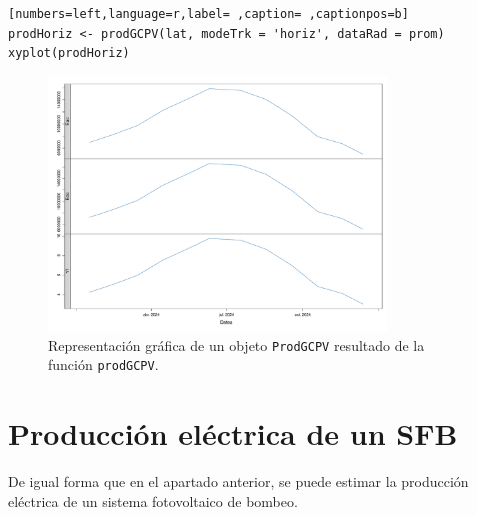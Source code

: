 \begin{lstlisting}[numbers=left,language=r,label= ,caption= ,captionpos=b]
prodHoriz <- prodGCPV(lat, modeTrk = 'horiz', dataRad = prom)
xyplot(prodHoriz)
\end{lstlisting}

\begin{figure}[!htb]
\centering
\includegraphics[width=0.8\textwidth]{figuras/codigo-prodgcpv.pdf}
\caption{Representación gráfica de un objeto \texttt{ProdGCPV} resultado de la función \texttt{prodGCPV}.}
\end{figure}

\section{Producción eléctrica de un SFB}
\label{sec:orgff49876}
De igual forma que en el apartado anterior, se puede estimar la producción eléctrica de un sistema fotovoltaico de bombeo.

